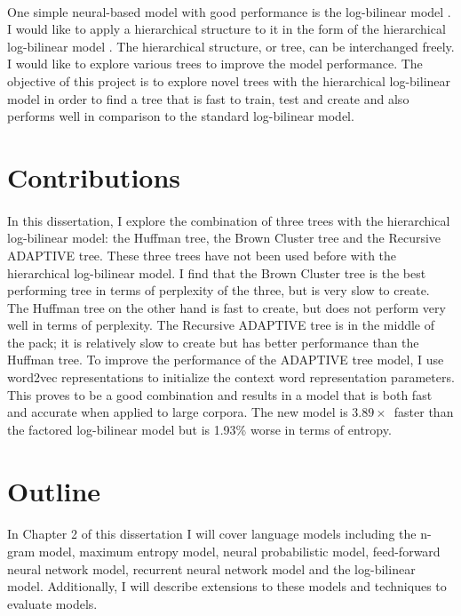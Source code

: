 \paragraph{}
One simple neural-based model with good performance is the log-bilinear model \cite{MnihHinton2007}. I would like to apply a hierarchical structure to it in the form of the hierarchical log-bilinear model \cite{MnihHinton2009}. The hierarchical structure, or tree, can be interchanged freely. I would like to explore various trees to improve the model performance. The objective of this project is to explore novel trees with the hierarchical log-bilinear model in order to find a tree that is fast to train, test and create and also performs well in comparison to the standard log-bilinear model.

\section{Contributions}
\paragraph{}
In this dissertation, I explore the combination of three trees with the hierarchical log-bilinear model: the Huffman tree, the Brown Cluster tree and the Recursive ADAPTIVE tree. These three trees have not been used before with the hierarchical log-bilinear model. I find that the Brown Cluster tree is the best performing tree in terms of perplexity of the three, but is very slow to create. The Huffman tree on the other hand is fast to create, but does not perform very well in terms of perplexity. The Recursive ADAPTIVE tree is in the middle of the pack; it is relatively slow to create but has better performance than the Huffman tree. To improve the performance of the ADAPTIVE tree model, I use word2vec representations to initialize the context word representation parameters. This proves to be a good combination and results in a model that is both fast and accurate when applied to large corpora. The new model is $3.89\times$~faster than the factored log-bilinear model but is 1.93\% worse in terms of entropy.

\section{Outline}
\paragraph{}
In Chapter 2 of this dissertation I will cover language models including the n-gram model, maximum entropy model, neural probabilistic model, feed-forward neural network model, recurrent neural network model and the log-bilinear model. Additionally, I will describe extensions to these models and techniques to evaluate models.

